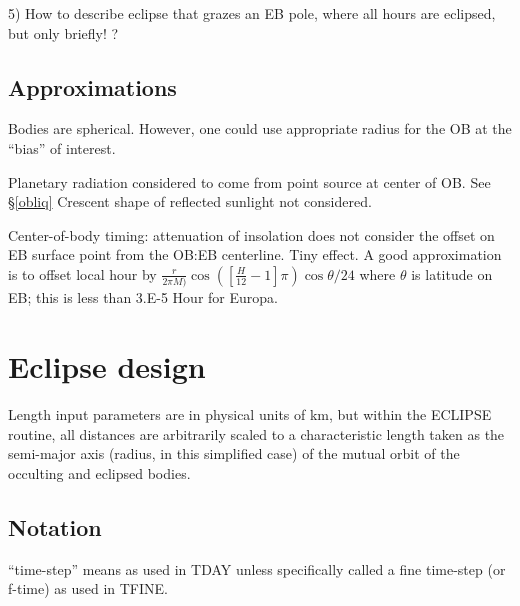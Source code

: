\documentclass{article}
\begin{document}
5) How to describe eclipse that grazes an EB pole, where all
hours are eclipsed, but only briefly! ?


\subsection{Approximations}

Bodies are spherical. However, one could use appropriate radius for the OB at the “bias” of interest.

Planetary radiation considered to come from point source at center of OB. See \S \ref{obliq} Crescent shape of reflected sunlight not considered.

Center-of-body timing: attenuation of insolation does not consider the offset on
EB surface point from the OB:EB centerline. Tiny effect. A good approximation is
to offset local hour by $\frac{r}{2 \pi M)} \cos([\frac{H}{12} -1] \pi) \cos
\theta/ 24 $ where $\theta$ is latitude on EB; this is less than 3.E-5 Hour for
Europa.

\section{Eclipse design} 

Length input parameters are in physical units of km, but within the ECLIPSE
routine, all distances are arbitrarily scaled to a characteristic length taken
as the semi-major axis (radius, in this simplified case) of the mutual orbit of
the occulting and eclipsed bodies.

\subsection{Notation}
``time-step'' means as used in TDAY unless specifically called a fine time-step (or f-time) as used in TFINE.
\end{document}
